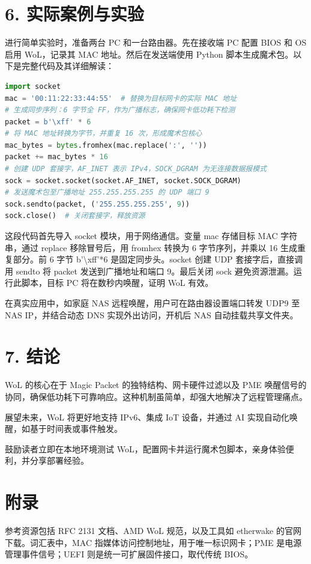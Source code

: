 \chapter{6. 实际案例与实验}
进行简单实验时，准备两台 PC 和一台路由器。先在接收端 PC 配置 BIOS 和 OS 启用 WoL，记录其 MAC 地址。然后在发送端使用 Python 脚本生成魔术包。以下是完整代码及其详细解读：\par
\begin{lstlisting}[language=python]
import socket
mac = '00:11:22:33:44:55'  # 替换为目标网卡的实际 MAC 地址
# 生成同步序列：6 字节全 FF，作为广播标志，确保网卡低功耗下检测
packet = b'\xff' * 6
# 将 MAC 地址转换为字节，并重复 16 次，形成魔术包核心
mac_bytes = bytes.fromhex(mac.replace(':', ''))
packet += mac_bytes * 16
# 创建 UDP 套接字，AF_INET 表示 IPv4，SOCK_DGRAM 为无连接数据报模式
sock = socket.socket(socket.AF_INET, socket.SOCK_DGRAM)
# 发送魔术包至广播地址 255.255.255.255 的 UDP 端口 9
sock.sendto(packet, ('255.255.255.255', 9))
sock.close()  # 关闭套接字，释放资源
\end{lstlisting}
这段代码首先导入 socket 模块，用于网络通信。变量 mac 存储目标 MAC 字符串，通过 replace 移除冒号后，用 fromhex 转换为 6 字节序列，并乘以 16 生成重复部分。前 6 字节 b'\textbackslash{}xff'*6 是固定同步头。socket 创建 UDP 套接字后，直接调用 sendto 将 packet 发送到广播地址和端口 9。最后关闭 sock 避免资源泄漏。运行此脚本，目标 PC 将在数秒内唤醒，证明 WoL 有效。\par
在真实应用中，如家庭 NAS 远程唤醒，用户可在路由器设置端口转发 UDP9 至 NAS IP，并结合动态 DNS 实现外出访问，开机后 NAS 自动挂载共享文件夹。\par
\chapter{7. 结论}
WoL 的核心在于 Magic Packet 的独特结构、网卡硬件过滤以及 PME 唤醒信号的协同，确保低功耗下可靠响应。这种机制虽简单，却强大地解决了远程管理痛点。\par
展望未来，WoL 将更好地支持 IPv6、集成 IoT 设备，并通过 AI 实现自动化唤醒，如基于时间表或事件触发。\par
鼓励读者立即在本地环境测试 WoL，配置网卡并运行魔术包脚本，亲身体验便利，并分享部署经验。\par
\chapter{附录}
参考资源包括 RFC 2131 文档、AMD WoL 规范，以及工具如 etherwake 的官网下载。词汇表中，MAC 指媒体访问控制地址，用于唯一标识网卡；PME 是电源管理事件信号；UEFI 则是统一可扩展固件接口，取代传统 BIOS。\par
